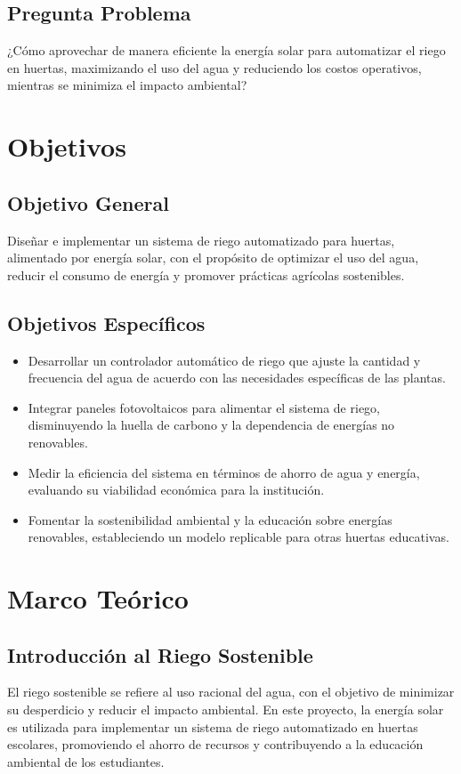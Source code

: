 \documentclass[12pt]{article}
\begin{document}
\subsection{Pregunta Problema}
¿Cómo aprovechar de manera eficiente la energía solar para automatizar el riego en huertas, maximizando el uso del agua y reduciendo los costos operativos, mientras se minimiza el impacto ambiental?
\newpage
\section{Objetivos}
\subsection{Objetivo General}
Diseñar e implementar un sistema de riego automatizado para huertas, alimentado por energía solar, con el propósito de optimizar el uso del agua, reducir el consumo de energía y promover prácticas agrícolas sostenibles.

\subsection{Objetivos Específicos}
\begin{itemize}
      \item Desarrollar un controlador automático de riego que ajuste la cantidad y frecuencia del agua de acuerdo con las necesidades específicas de las plantas.
      \item Integrar paneles fotovoltaicos para alimentar el sistema de riego, disminuyendo la huella de carbono y la dependencia de energías no renovables.
      \item Medir la eficiencia del sistema en términos de ahorro de agua y energía, evaluando su viabilidad económica para la institución.
      \item Fomentar la sostenibilidad ambiental y la educación sobre energías renovables, estableciendo un modelo replicable para otras huertas educativas.
\end{itemize}
\newpage
\section{Marco Teórico}
\subsection{Introducción al Riego Sostenible}
El riego sostenible se refiere al uso racional del agua, con el objetivo de minimizar su desperdicio y reducir el impacto ambiental. En este proyecto, la energía solar es utilizada para implementar un sistema de riego automatizado en huertas escolares, promoviendo el ahorro de recursos y contribuyendo a la educación ambiental de los estudiantes.
\end{document}
